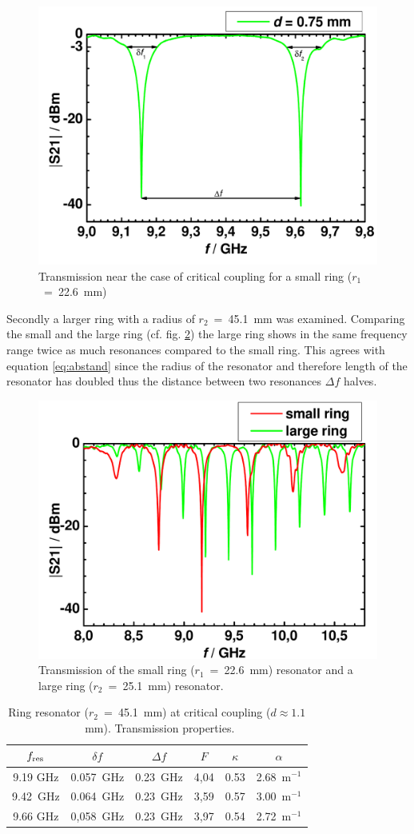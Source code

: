 \begin{figure}%
\centering
\includegraphics[width=.6\columnwidth]{Grafiken/03_075.pdf}%
\caption{Transmission near the case of critical coupling for a small ring ($r_1$~=~22.6~mm)}%
\label{fig:03_075}%
\end{figure}

Secondly a larger ring with a radius of $r_2$~=~45.1~mm was examined. Comparing the small and the large ring (cf. fig. \ref{fig:04_vergleich}) the large ring shows in the same frequency range twice as much resonances compared to the small ring. This agrees with equation \eqref{eq:abstand} since the  radius of the resonator and therefore length of the resonator has doubled thus the distance between two resonances $\Delta f$ halves.
\begin{figure}%
\centering
\includegraphics[width=.6\columnwidth]{Grafiken/04_vergleich.pdf}%
\caption{Transmission of the small ring ($r_1$~=~22.6~mm) resonator and a large ring ($r_2$~=~25.1~mm)  resonator.}%
\label{fig:04_vergleich}%
\end{figure}

\begin{table}%
\centering
\caption{Ring resonator ($r_2$~=~45.1~mm) at critical coupling ($d \approx 1.1$~mm). Transmission properties.}
\begin{tabular}{cccccc}
\toprule
$f_{\mathrm{res}}$	& $\delta f$	& $\Delta f$ & $F$ & $\kappa$ & $\alpha$\\
\midrule
9.19 GHz	& 0.057~GHz	& 0.23~GHz	& 4,04	& 0.53	& 2.68~m$^{-1}$ \\
9.42~GHz	&	0.064~GHz	&	0.23~GHz	& 3,59	& 0.57	&	3.00~m$^{-1}$\\
9.66 GHz	& 0,058~GHz	& 0.23~GHz	&	3,97	&	0.54	& 2.72~m$^{-1}$ \\
\bottomrule 
\end{tabular}
\label{tab:ring_gross}
\end{table}

